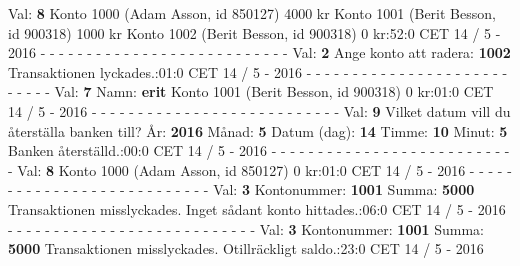 \begin{multicols}{2}
Val: \textbf{8}\newline
Konto 1000 (Adam Asson, id 850127) 4000 kr\newline
Konto 1001 (Berit Besson, id 900318) 1000 kr\newline
Konto 1002 (Berit Besson, id 900318) 0 kr:52:0 CET 14 / 5 - 2016\newline
- - - - - - - - - - - - - - - - - - - - - - - - - - -\newline
Val: \textbf{2}\newline
Ange konto att radera: \textbf{1002}\newline
Transaktionen lyckades.:01:0 CET 14 / 5 - 2016\newline
- - - - - - - - - - - - - - - - - - - - - - - - - - -\newline
Val: \textbf{7}\newline
Namn: \textbf{erit}\newline
Konto 1001 (Berit Besson, id 900318) 0 kr:01:0 CET 14 / 5 - 2016\newline
- - - - - - - - - - - - - - - - - - - - - - - - - - -\newline
Val: \textbf{9}\newline
Vilket datum vill du återställa banken till?\newline
År: \textbf{2016}\newline
Månad: \textbf{5}\newline
Datum (dag): \textbf{14}\newline
Timme: \textbf{10}\newline
Minut: \textbf{5}\newline
Banken återställd.:00:0 CET 14 / 5 - 2016\newline
- - - - - - - - - - - - - - - - - - - - - - - - - - -\newline
Val: \textbf{8}\newline
Konto 1000 (Adam Asson, id 850127) 0 kr:01:0 CET 14 / 5 - 2016\newline
- - - - - - - - - - - - - - - - - - - - - - - - - - -\newline
Val: \textbf{3}\newline
Kontonummer: \textbf{1001}\newline
Summa: \textbf{5000}\newline
Transaktionen misslyckades. Inget sådant konto hittades.:06:0 CET 14 / 5 - 2016\newline
- - - - - - - - - - - - - - - - - - - - - - - - - - -\newline
Val: \textbf{3}\newline
Kontonummer: \textbf{1001}\newline
Summa: \textbf{5000}\newline
Transaktionen misslyckades.  Otillräckligt saldo.:23:0 CET 14 / 5 - 2016\newline
\end{multicols}
